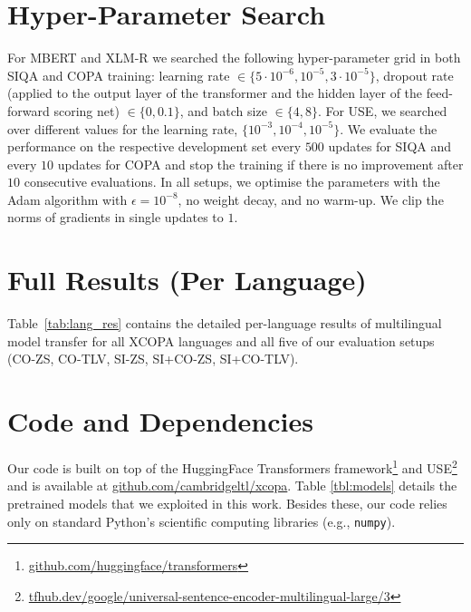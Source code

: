 \documentclass[11pt,a4paper]{article}
\begin{document}
\section{Hyper-Parameter Search}
For MBERT and XLM-R we searched the following hyper-parameter grid in both SIQA and COPA training: learning rate $\in \{5\cdot10^{-6}, 10^{-5}, 3\cdot 10^{-5}\}$, dropout rate (applied to the output layer of the transformer and the hidden layer of the feed-forward scoring net) $\in \{0, 0.1\}$, and batch size $\in \{4, 8\}$. For USE, we searched over different values for the learning rate, $\{10^{-3},10^{-4},10^{-5}\}$. We evaluate the performance on the respective development set every $500$ updates for SIQA and every $10$ updates for COPA and stop the training if there is no improvement after $10$ consecutive evaluations. In all setups, we optimise the parameters with the Adam algorithm \cite{kingma2015adam} with $\epsilon = 10^{-8}$, no weight decay, and no warm-up. We clip the norms of gradients in single updates to $1$.  

\section{Full Results (Per Language)} 
\label{ss:resultsperlang}
Table~\ref{tab:lang_res} contains the detailed per-language results of multilingual model transfer for all XCOPA languages and all five of our evaluation setups (CO-ZS, CO-TLV, SI-ZS, SI+CO-ZS, SI+CO-TLV).

\section{Code and Dependencies}

Our code is built on top of the HuggingFace Transformers framework\footnote{\url{github.com/huggingface/transformers}} and USE\footnote{\url{tfhub.dev/google/universal-sentence-encoder-multilingual-large/3}} and is available at \url{github.com/cambridgeltl/xcopa}. Table \ref{tbl:models} details the pretrained models that we exploited in this work. Besides these, our code relies only on standard Python's scientific computing libraries (e.g., \texttt{numpy}).




 

 
\end{document}
